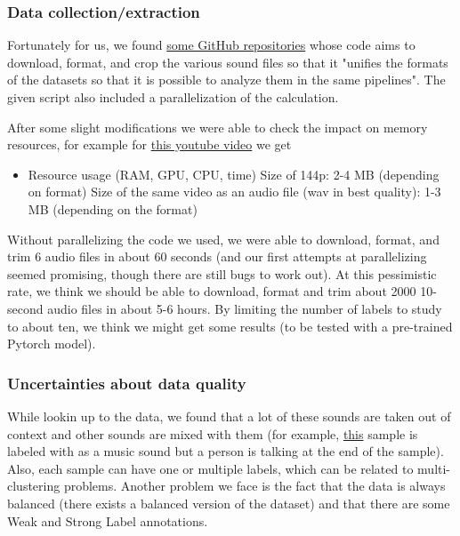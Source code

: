 \documentclass[11pt]{article}
\begin{document}
\subsubsection{Data collection/extraction}

Fortunately for us, we found \hyperref[item:google-audioset-reformatted]{some GitHub repositories} whose code aims to download, format, and crop the various sound files so that it "unifies the formats of the datasets so that it is possible to analyze them in the same pipelines". The given script also included a parallelization of the calculation.

After some slight modifications we were able to check the impact on memory resources, for example for \href{https://www.youtube.com/watch?v=dQw4w9WgXcQ}{this youtube video} we get

\begin{itemize}
  \item Resource usage (RAM, GPU, CPU, time)
        \subitem Size of 144p: 2-4 MB (depending on format)
        \subitem Size of the same video as an audio file (wav in best quality): 1-3 MB (depending on the format)
\end{itemize}

Without parallelizing the code we used, we were able to download, format, and trim 6 audio files in about 60 seconds (and our first attempts at parallelizing seemed promising, though there are still bugs to work out). At this pessimistic rate, we think we should be able to download, format and trim about 2000 10-second audio files in about 5-6 hours. By limiting the number of labels to study to about ten, we think we might get some results (to be tested with a pre-trained Pytorch model).

\subsubsection{Uncertainties about data quality}

While lookin up to the data, we found that a lot of these sounds are taken out of context and other sounds are mixed with them (for example, \hyperref{https://www.youtube.com/watch?v=-0CamVQdP_Y}{}{}{this} sample is labeled with as a music sound but a person is talking at the end of the sample). Also, each sample can have one or multiple labels, which can be related to multi-clustering problems.
Another problem we face is the fact that the data is always balanced (there exists a balanced version of the dataset) and that there are some Weak and Strong Label annotations.
\end{document}
